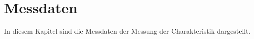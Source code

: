 \section{Messdaten}

In diesem Kapitel sind die Messdaten der Messung der Charakteristik dargestellt.





